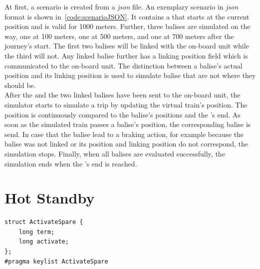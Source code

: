 At first, a scenario is created from a \textit{json} file.
An exemplary scenario in \textit{json} format is shown in~\autoref{code:scenarioJSON}.
It contains a  that starts at the current position and is valid for 1000 meters.
Further, three balises are simulated on the way, one at 100 meters, one at 500 meters, and one at 700 meters after the journey's start.
The first two balises will be linked with the on-board unit while the third will not.
Any linked balise further has a linking position field which is communicated to the on-board unit.
The distinction between a balise's actual position and its linking position is used to simulate balise that are not where they should be.
\\

After the  and the two linked balises have been sent to the on-board unit, the simulator starts to simulate a trip by updating the virtual train's position.
The position is continuously compared to the balise's positions and the 's end.
As soon as the simulated train passes a balise's position, the corresponding balise is send.
In case that the balise lead to a braking action, for example because the balise was not linked or its position and linking position do not correspond, the simulation stops.
Finally, when all balises are evaluated successfully, the simulation ends when the 's end is reached.

\section{Hot Standby}
\begin{lstlisting}[caption={\abr{IDL} definition for the \texttt{ActivateSpare} topic. This topic is used to activate or deactivate spare replicas. The \texttt{term} field encodes the term in which the activate or deactivate call has been made and \texttt{activate} gets interpreted as a boolean that encodes whether the spare should be activated or deactivated.}, label=code:activateSpare]
struct ActivateSpare {
    long term;
    long activate;
};
#pragma keylist ActivateSpare
\end{lstlisting}

